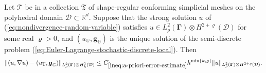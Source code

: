 \documentclass[final,onefignum,onetabnum]{mousaviart}
\begin{document}
			
			\vspace*{1mm}
			\begin{theorem}
				\label{lem:a-priori-error-estimate}
				Let $\mathcal{T}$ be in a collection $\mathfrak{T}$ of
				shape-regular conforming simplicial meshes on the polyhedral domain $\mathcal{D} \subset \mathbb{R}^d$. Suppose that the strong solution $u$ of (\ref{eq:nondivergence-random-variable}) satisfies $u \in L^2_{\rho}(\boldsymbol{\Gamma}) \otimes H^{2+ \varrho}(\mathcal{D})$ for some real $\varrho >0$, and $(u_{\mathbb{U}} , \boldsymbol{g}_{\mathbb{G}})$ is the unique solution of the semi-discrete problem (\ref{eq:Euler-Lagrange-stochastic-discrete-local}). Then
				\begin{equation}
					\label{ineq:a-priori-error-estimate}
					\lVert (u, \nabla u) - (u_{\mathbb{U}} , \boldsymbol{g}_{\mathbb{G}}) \rVert_{L^2_{\rho}(\boldsymbol{\Gamma}) \otimes H^1_h(\mathcal{D})}
					\leq
					C_{\ref{ineq:a-priori-error-estimate}}
					h^{\min\left\lbrace k, \varrho \right\rbrace } \lVert u \rVert_{L^2_{\rho}(\boldsymbol{\Gamma}) \otimes H^{2 + \varrho}(\mathcal{D})}.
				\end{equation}
			\end{theorem}
			
\end{document}
